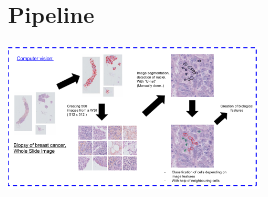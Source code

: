 \documentclass[a0,portrait]{a0poster}
\begin{document}
\begin{multicols}{2}




\color{DarkSlateGray} %

\section*{Pipeline}

  \includegraphics[width = 0.5\textwidth]{ComputerVision.png}


\end{multicols}
\end{document}
